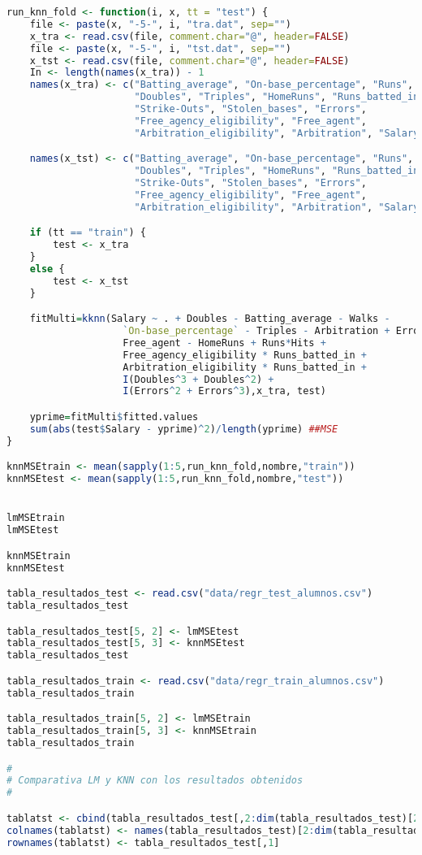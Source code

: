 \begin{lstlisting}[language=R]
run_knn_fold <- function(i, x, tt = "test") {
	file <- paste(x, "-5-", i, "tra.dat", sep="")
	x_tra <- read.csv(file, comment.char="@", header=FALSE)
	file <- paste(x, "-5-", i, "tst.dat", sep="")
	x_tst <- read.csv(file, comment.char="@", header=FALSE)
	In <- length(names(x_tra)) - 1
	names(x_tra) <- c("Batting_average", "On-base_percentage", "Runs", "Hits",
					  "Doubles", "Triples", "HomeRuns", "Runs_batted_in", "Walks",
					  "Strike-Outs", "Stolen_bases", "Errors",
					  "Free_agency_eligibility", "Free_agent",
					  "Arbitration_eligibility", "Arbitration", "Salary")

	names(x_tst) <- c("Batting_average", "On-base_percentage", "Runs", "Hits",
					  "Doubles", "Triples", "HomeRuns", "Runs_batted_in", "Walks",
					  "Strike-Outs", "Stolen_bases", "Errors",
					  "Free_agency_eligibility", "Free_agent",
					  "Arbitration_eligibility", "Arbitration", "Salary")

	if (tt == "train") {
		test <- x_tra
	}
	else {
		test <- x_tst
	}

	fitMulti=kknn(Salary ~ . + Doubles - Batting_average - Walks -
					`On-base_percentage` - Triples - Arbitration + Errors -
					Free_agent - HomeRuns + Runs*Hits +
					Free_agency_eligibility * Runs_batted_in +
					Arbitration_eligibility * Runs_batted_in +
					I(Doubles^3 + Doubles^2) +
					I(Errors^2 + Errors^3),x_tra, test)

	yprime=fitMulti$fitted.values
	sum(abs(test$Salary - yprime)^2)/length(yprime) ##MSE
}

knnMSEtrain <- mean(sapply(1:5,run_knn_fold,nombre,"train"))
knnMSEtest <- mean(sapply(1:5,run_knn_fold,nombre,"test"))


lmMSEtrain
lmMSEtest

knnMSEtrain
knnMSEtest

tabla_resultados_test <- read.csv("data/regr_test_alumnos.csv")
tabla_resultados_test

tabla_resultados_test[5, 2] <- lmMSEtest
tabla_resultados_test[5, 3] <- knnMSEtest
tabla_resultados_test

tabla_resultados_train <- read.csv("data/regr_train_alumnos.csv")
tabla_resultados_train

tabla_resultados_train[5, 2] <- lmMSEtrain
tabla_resultados_train[5, 3] <- knnMSEtrain
tabla_resultados_train

#
# Comparativa LM y KNN con los resultados obtenidos
#

tablatst <- cbind(tabla_resultados_test[,2:dim(tabla_resultados_test)[2]])
colnames(tablatst) <- names(tabla_resultados_test)[2:dim(tabla_resultados_test)[2]]
rownames(tablatst) <- tabla_resultados_test[,1]


\end{lstlisting}
